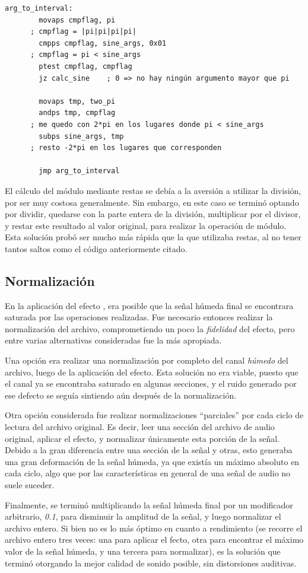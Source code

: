 \lstset{language=[x86masm]Assembler}
\begin{lstlisting}[frame=single]
  arg_to_interval:
        movaps cmpflag, pi              
	  ; cmpflag = |pi|pi|pi|pi|
        cmpps cmpflag, sine_args, 0x01  
	  ; cmpflag = pi < sine_args
        ptest cmpflag, cmpflag
        jz calc_sine    ; 0 => no hay ningún argumento mayor que pi

        movaps tmp, two_pi
        andps tmp, cmpflag              
	  ; me quedo con 2*pi en los lugares donde pi < sine_args
        subps sine_args, tmp            
	  ; resto -2*pi en los lugares que corresponden

        jmp arg_to_interval
\end{lstlisting}

El cálculo del módulo mediante restas se debía a la aversión a utilizar la división, por ser muy costosa generalmente. Sin embargo, en este caso se terminó optando por dividir, quedarse con la parte entera de la división, multiplicar por el divisor, y restar este resultado al valor original, para realizar la operación de módulo. Esta solución probó ser mucho más rápida que la que utilizaba restas, al no tener tantos saltos como el código anteriormente citado.

\subsection{Normalización}
\label{subsec:desarrollo-problemas-normalizacion}

En la aplicación del efecto , era posible que la señal húmeda final se encontrara saturada por las operaciones realizadas. Fue necesario entonces realizar la normalización del archivo, comprometiendo un poco la \textit{fidelidad} del efecto, pero entre varias alternativas consideradas fue la más apropiada.

Una opción era realizar una normalización por completo del canal \textit{húmedo} del archivo, luego de la aplicación del efecto. Esta solución no era viable, puesto que el canal ya se encontraba saturado en algunas secciones, y el ruido generado por ese defecto se seguía sintiendo aún después de la normalización.

Otra opción considerada fue realizar normalizaciones ``parciales'' por cada ciclo de lectura del archivo original. Es decir, leer una sección del archivo de audio original, aplicar el efecto, y normalizar únicamente esta porción de la señal. Debido a la gran diferencia entre una sección de la señal y otras, esto generaba una gran deformación de la señal húmeda, ya que existía un máximo absoluto en cada ciclo, algo que por las características en general de una señal de audio no suele suceder.

Finalmente, se terminó multiplicando la señal húmeda final por un modificador arbitrario, \textit{0.1}, para disminuir la amplitud de la señal, y luego normalizar el archivo entero. Si bien no es lo más óptimo en cuanto a rendimiento (se recorre el archivo entero tres veces: una para aplicar el fecto, otra para encontrar el máximo valor de la señal húmeda, y una tercera para normalizar), es la solución que terminó otorgando la mejor calidad de sonido posible, sin distorsiones auditivas.